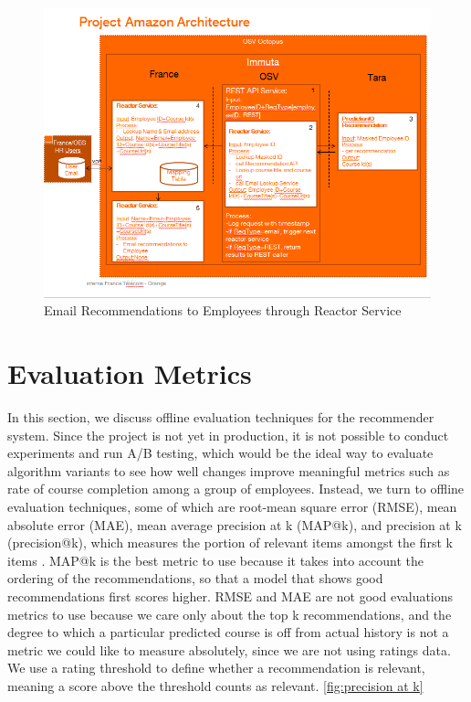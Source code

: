 \documentclass[12pt,journal]{IEEEtran}
\begin{document}
 \begin{figure}[htbp]
\begin{center}
\includegraphics[width=1\columnwidth]{amazon_architecture}
\end{center}
\caption{Email Recommendations to Employees through Reactor Service}
\label{fig:amazon_architecture}
\end{figure}


\section{Evaluation Metrics}  \label{sec:Evaluation Metrics}
In this section, we discuss offline evaluation techniques for the recommender system.  Since the project is not yet in production, it is not possible to conduct experiments and run A/B testing, which would be the ideal way to evaluate algorithm variants to see how well changes improve meaningful metrics such as rate of course completion among a group of employees.  Instead, we turn to offline evaluation techniques, some of which are root-mean square error (RMSE), mean absolute error (MAE), mean average precision at k (MAP@k), and precision at k (precision@k), which measures the portion of relevant items amongst the first k items \cite{EvaluationExplained}.  MAP@k is the best metric to use because it takes into account the ordering of the recommendations, so that a model that shows good recommendations first scores higher.  RMSE and MAE are not good evaluations metrics to use because we care only about the top k recommendations, and the degree to which a particular predicted course is off from actual history is not a metric we could like to measure absolutely, since we are not using ratings data.  We use a rating threshold to define whether a recommendation is relevant, meaning a score above the threshold counts as relevant. \ref{fig:precision at k}
\end{document}
